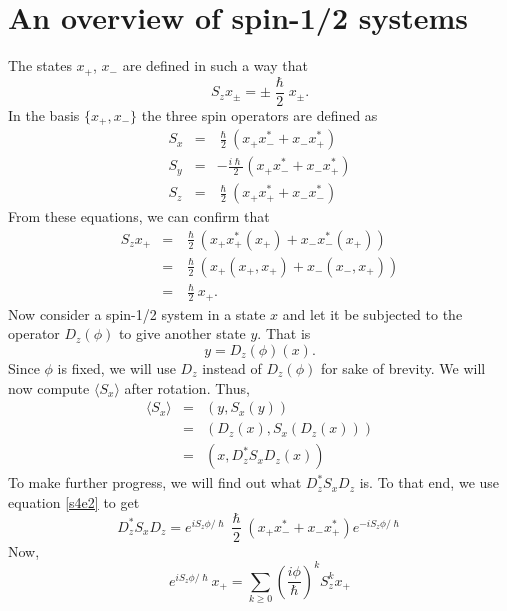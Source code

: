 \documentclass{article}
\numberwithin{equation}{section}
\newcommand{\qev}[1]{\langle #1 \rangle} %
\theoremstyle{plain}
\numberwithin{thm}{section}
\theoremstyle{plain}
\numberwithin{prop}{section}
\theoremstyle{definition}
\numberwithin{defn}{section}
\theoremstyle{remark}
\begin{document}
\section{An overview of spin-1/2 systems}\label{s4}
The states $x_+$, $x_-$ are defined in such a way that
\begin{equation}\label{s4e1}
S_zx_{\pm} = \pm\frac{\hslash}{2}x_\pm.
\end{equation}
In the basis $\{x_+, x_-\}$ the three spin operators are defined as
\begin{eqnarray}
S_x &=& \frac{\hslash}{2}(x_+ x_-^\ast + x_- x_+^\ast) \label{s4e2} \\
S_y &=& -\frac{i\hslash}{2}(x_+ x_-^\ast + x_- x_+^\ast) \label{s4e3} \\
S_z &=& \frac{\hslash}{2}(x_+ x_+^\ast + x_- x_-^\ast) \label{s4e4}
\end{eqnarray}
From these equations, we can confirm that
\begin{eqnarray}
S_z x_+ &=& \frac{\hslash}{2}\left( x_+ x_+^\ast(x_+) + x_-x_-^\ast(x_+)\right)
\nonumber \\
 &=& \frac{\hslash}{2}\left(x_+(x_+, x_+) + x_-(x_-, x_+)\right) \nonumber \\
 &=& \frac{\hslash}{2}x_+. \label{s4e5}
\end{eqnarray}
Now consider a spin-1/2 system in a state $x$ and let it be subjected to the
operator $D_z(\phi)$ to give another state $y$. That is
\begin{equation}\label{s4e6}
y = D_z(\phi)(x).
\end{equation}
Since $\phi$ is fixed, we will use $D_z$ instead of $D_z(\phi)$ for sake of
brevity. We will now compute $\qev{S_x}$ after rotation. Thus,
\begin{eqnarray}
\qev{S_x} &=& (y, S_x(y)) \nonumber \\
 &=& (D_z(x), S_x(D_z(x))) \nonumber \\
 &=& (x, D_z^\ast S_x D_z (x)) \label{s4e7}
\end{eqnarray}
To make further progress, we will find out what $D_z^\ast S_xD_z$ is. To that
end, we use equation \eqref{s4e2} to get
\begin{equation}\label{s4e8}
D_z^\ast S_x D_z = e^{iS_z\phi/\hslash}\frac{\hslash}{2}(x_+x_-^\ast + 
x_-x_+^\ast)e^{-iS_z\phi/\hslash}
\end{equation}
Now,
\begin{equation}\label{s4e9}
e^{iS_z\phi/\hslash}x_+ = 
\sum_{k \ge 0}\left(\frac{i\phi}{\hslash}\right)^kS_z^k x_+
\end{equation}
\end{document}
